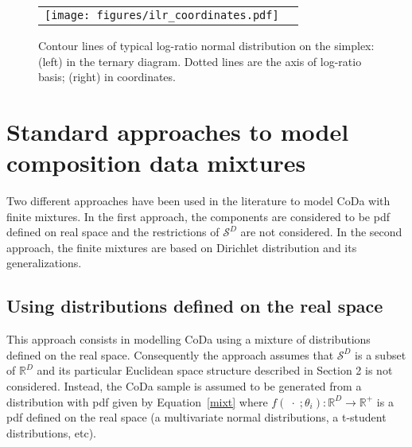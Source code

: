 \documentclass[10pt, a4paper]{article}
\begin{document}
\begin{figure}[thbp]
\begin{center}
\begin{tabular}{cc}
  \texttt{[image: figures/ilr\_coordinates.pdf]} \\
 \end{tabular}
 \caption{Contour lines of typical log-ratio normal distribution on the simplex: (left) in the ternary diagram. Dotted lines are the axis of log-ratio basis; (right) in coordinates. }\label{fig01}
\end{center}
\end{figure}



\section{Standard approaches to model composition data mixtures}
\label{standard_section}

\noindent Two different approaches have been used in the literature to model CoDa with finite mixtures. 
In the first approach,  the components are considered to be pdf defined on real space and the restrictions of $\mathcal{S}^D$ are not considered. In the second approach,  the finite mixtures are based on Dirichlet distribution and its generalizations.


\subsection{Using distributions defined on the real space}
\label{real_section}

This approach consists in modelling CoDa using a mixture of distributions defined on the real space. Consequently the approach assumes that $\mathcal{S}^D$ is a subset of $\mathbb{R}^D$ and its particular Euclidean space structure described in Section 2 is not considered. Instead, the CoDa sample is assumed to be generated from a distribution with pdf given by Equation~\ref{mixt} where $f(\;\cdot\;;\theta_i): \mathbb{R}^D \rightarrow \mathbb{R}^+$ is a pdf defined on the real space (a multivariate normal distributions, a  t-student distributions, etc).
\end{document}
